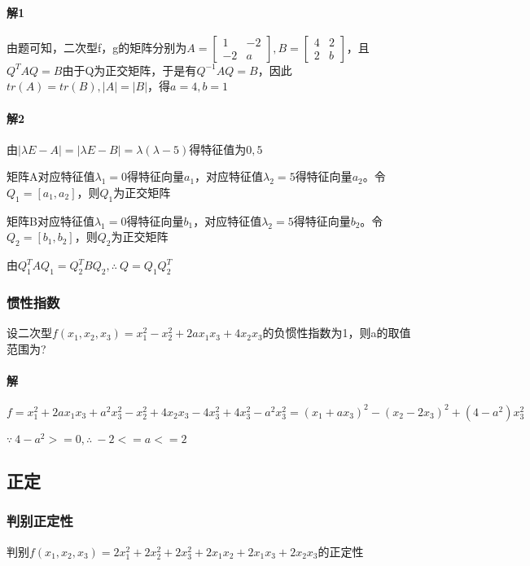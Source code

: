 \paragraph{解1}
由题可知，二次型f，g的矩阵分别为\(A = \begin{bmatrix}
    1 & -2 \\ 
    -2 & a
\end{bmatrix}, B = \begin{bmatrix}
    4 & 2 \\ 
    2 & b
\end{bmatrix}\)，且\(Q^TAQ = B\)由于Q为正交矩阵，于是有\(Q^{-1}AQ = B\)，因此\(tr(A) = tr(B), |A| = |B|\)，得\(a = 4, b = 1\)

\paragraph{解2}
由\(|\lambda E - A| = |\lambda E - B| = \lambda(\lambda - 5)\)得特征值为\(0, 5\)

矩阵A对应特征值\(\lambda_1 = 0\)得特征向量\(a_1\)，对应特征值\(\lambda_2 = 5\)得特征向量\(a_2\)。令\(Q_1 = [a_1, a_2]\)，则\(Q_1\)为正交矩阵

矩阵B对应特征值\(\lambda_1 = 0\)得特征向量\(b_1\)，对应特征值\(\lambda_2 = 5\)得特征向量\(b_2\)。令\(Q_2 = [b_1, b_2]\)，则\(Q_2\)为正交矩阵

由\(Q_1^TAQ_1 = Q_2^TBQ_2, \therefore\ Q = Q_1Q_2^T\)


\subsubsection{惯性指数}
设二次型\(f(x_1, x_2, x_3) = x_1^2 - x_2^2 + 2ax_1x_3 + 4x_2x_3\)的负惯性指数为1，则a的取值范围为?

\paragraph{解}
\(f = x_1^2 + 2ax_1x_3 + a^2x_3^2 - x_2^2 + 4x_2x_3 - 4x_3^2 + 4x_3^2 - a^2x_3^2 = (x_1 + ax_3)^2 - (x_2 - 2x_3)^2 + (4 - a^2)x_3^2\)

\(\because\ 4 - a^2 >= 0, \therefore\ -2 <= a <= 2\)


\subsection{正定}

\subsubsection{判别正定性}
判别\(f(x_1, x_2, x_3) = 2x_1^2 + 2x_2^2 + 2x_3^2 + 2x_1x_2 + 2x_1x_3 + 2x_2x_3\)的正定性

